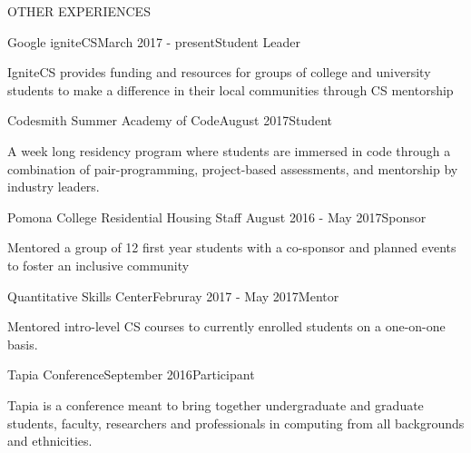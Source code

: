 \documentclass{resume} %
\begin{document}
\begin{rSection}{OTHER EXPERIENCES}

\begin{rSubsection}{Google igniteCS}{March 2017 - present}{Student Leader}
\item IgniteCS provides funding and resources for groups of college and university students to make a difference in their local communities through CS mentorship
\end{rSubsection}


\begin{rSubsection}{Codesmith Summer Academy of Code}{August 2017}{Student}
\item A week long residency program where students are immersed in code through a combination of pair-programming, project-based assessments, and mentorship by industry leaders.
\end{rSubsection}


\begin{rSubsection}{Pomona College Residential Housing Staff }{August 2016 - May 2017}{Sponsor}
\item Mentored a group of 12 first year students with a co-sponsor and planned events to foster an inclusive community

\end{rSubsection}


\begin{rSubsection}{Quantitative Skills Center}{Februray 2017 - May 2017}{Mentor}
\item Mentored intro-level CS courses to currently enrolled students on a one-on-one basis.
\end{rSubsection}


\begin{rSubsection}{Tapia Conference}{September 2016}{Participant}
\item Tapia is a conference meant to bring together undergraduate and graduate students, faculty, researchers and professionals in computing from all backgrounds and ethnicities.
\end{rSubsection}

\end{rSection}
\end{document}
